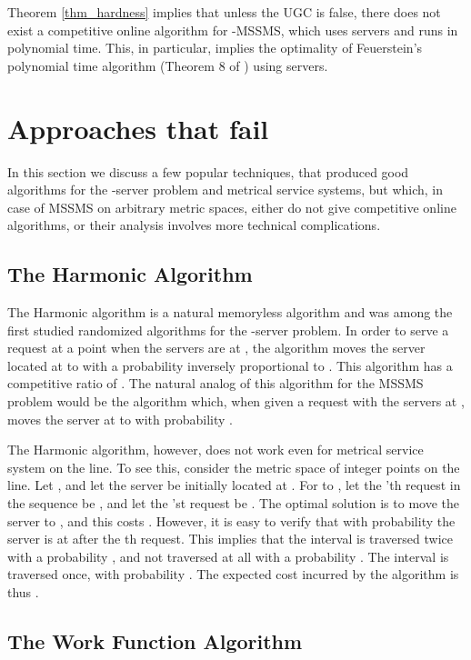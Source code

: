 \documentclass[11pt]{article}
\theoremstyle{plain}\newtheorem{theorem}{Theorem}
\theoremstyle{definition}
\theoremstyle{remark}
\begin{document}
Theorem \ref{thm_hardness} implies that unless the UGC is false, there does not exist a competitive online algorithm for -MSSMS, which uses  servers and runs in polynomial time. This, in particular, implies the optimality of Feuerstein's polynomial time algorithm (Theorem 8 of \cite{Feuerstein98}) using  servers.

\section{Approaches that fail}\label{sec_limitations}

In this section we discuss a few popular techniques, that produced good algorithms for the -server problem and metrical service systems, but which, in case of MSSMS on arbitrary metric spaces, either do not give competitive online algorithms, or their analysis involves more technical complications.

\subsection{The Harmonic Algorithm}

The Harmonic algorithm is a natural memoryless algorithm and was among the first studied randomized algorithms for the -server problem. In order to serve a request at a point  when the servers are at , the algorithm moves the server located at  to  with a probability inversely proportional to . This algorithm has a competitive ratio of  \cite{Grove91, BartalG00}. The natural analog of this algorithm for the MSSMS problem would be the algorithm which, when given a request  with the servers at , moves the server at  to  with probability .

The Harmonic algorithm, however, does not work even for metrical service system on the line. To see this, consider the metric space of integer points on the line. Let ,  and let the server be initially located at . For  to , let the 'th request in the sequence be , and let the 'st request be . The optimal solution is to move the server to , and this costs . However, it is easy to verify that with probability  the server is at  after the th request. This implies that the interval  is traversed twice with a probability , and not traversed at all with a probability . The interval  is traversed once, with probability . The expected cost incurred by the algorithm is thus . 


\subsection{The Work Function Algorithm}
\end{document}

